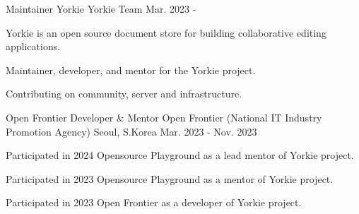 

\begin{cventries}

  \cventry
    {Maintainer} %
    {Yorkie} %
    {Yorkie Team} %
    {Mar. 2023 - } %
    {
      \begin{cvitems} %
        \item {Yorkie is an open source document store for building collaborative editing applications.}
        \item {Maintainer, developer, and mentor for the Yorkie project.}
        \item {Contributing on community, server and infrastructure.}
      \end{cvitems}
    }


  \cventry
    {Open Frontier Developer \& Mentor} %
    {Open Frontier (National IT Industry Promotion Agency)} %
    {Seoul, S.Korea} %
    {Mar. 2023 - Nov. 2023} %
    {
      \begin{cvitems} %
        \item {Participated in 2024 Opensource Playground as a lead mentor of Yorkie project.}
        \item {Participated in 2023 Opensource Playground as a mentor of Yorkie project.}
        \item {Participated in 2023 Open Frontier as a developer of Yorkie project.}
      \end{cvitems}
    }


\end{cventries}
